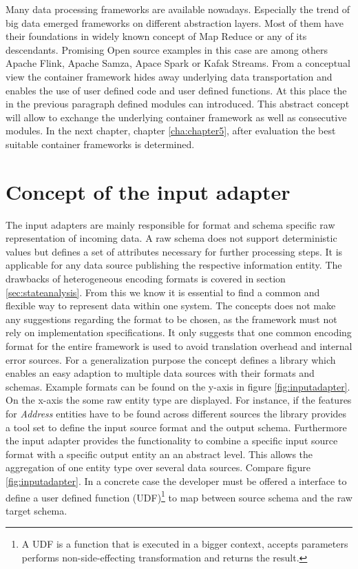 Many data processing frameworks are available nowadays. Especially the trend of big data emerged frameworks on different abstraction layers. Most of them have their foundations in widely known concept of Map Reduce\cite{dean_ghemawat_2008} or any of its descendants. Promising Open source examples in this case are among others Apache Flink\cite{flink_2017}, Apache Samza\cite{samza_2017}, Apace Spark\cite{spark_2017} or Kafak Streams\cite{kafka_2017}. From a conceptual view the container framework hides away underlying data transportation and enables the use of user defined code and user defined functions. At this place the in the previous paragraph defined modules can introduced. This abstract concept will allow to exchange the underlying container framework as well as consecutive modules. In the next chapter, chapter \ref{cha:chapter5}, after evaluation the best suitable container frameworks is determined.

\section{Concept of the input adapter \label{sec:inputadapter}}

The input adapters are mainly responsible for format and schema specific raw representation of incoming data. A raw schema does not support deterministic values but defines a set of attributes necessary for further processing steps. It is applicable for any data source publishing the respective information entity. The drawbacks of heterogeneous encoding formats is covered in section \ref{sec:stateanalysis}. From this we know it is essential to find a common and flexible way to represent data within one system. The concepts does not make any suggestions regarding the format to be chosen, as the framework must not rely on implementation specifications. It only suggests that one common encoding format for the entire framework is used to avoid translation overhead and internal error sources. For a generalization purpose the concept defines a library which enables an easy adaption to multiple data sources with their formats and schemas. Example formats can be found on the y-axis in figure \ref{fig:inputadapter}. On the x-axis the some raw entity type are displayed. For instance, if the features for \textit{Address} entities have to be found across different sources the library provides a tool set to define the input source format and the output schema. Furthermore the input adapter provides the functionality to combine a specific input source format with a specific output entity an an abstract level. This allows the aggregation of one entity type over several data sources. Compare figure \ref{fig:inputadapter}. In a concrete case the developer must be offered a interface to define a user defined function (UDF)\footnote{A UDF is a function that is executed in a bigger context, accepts parameters performs non-side-effecting transformation and returns the result.} to map between source schema and the raw target schema. 

